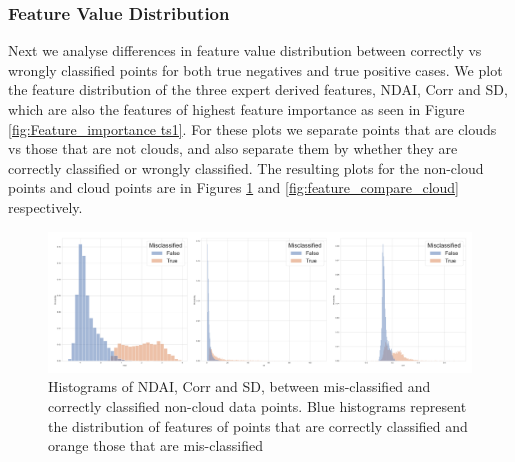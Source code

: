 \documentclass[11pt, letterpaper, journal]{IEEEtran}
\begin{document}
\subsubsection{Feature Value Distribution}
Next we analyse differences in feature value distribution between correctly vs wrongly classified points for both true negatives and true positive cases. We plot the feature distribution of the three expert derived features, NDAI, Corr and SD, which are also the features of highest feature importance as seen in Figure \ref{fig:Feature_importance ts1}. For these plots we separate points that are clouds vs those that are not clouds, and also separate them by whether they are correctly classified or wrongly classified. The resulting plots for the non-cloud points and cloud points are in Figures \ref{fig:feature_compare_noncloud} and \ref{fig:feature_compare_cloud} respectively. 

\begin{figure}[h]
\centering
\includegraphics[width=1.0\textwidth]{statics/feature_compare_true_neg_tr_23_te_1.png}
\caption{Histograms of NDAI, Corr and SD, between mis-classified and correctly classified non-cloud data points. Blue histograms represent the distribution of features of points that are correctly classified and orange those that are mis-classified}
\label{fig:feature_compare_noncloud}
\end{figure}
\end{document}
